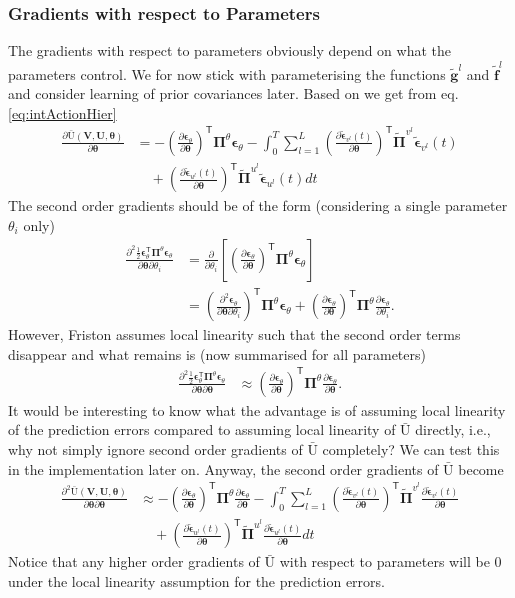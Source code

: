 \documentclass[a4paper,10pt]{article}
\newcommand{\bs}[1]{\mathbf{#1}}					%
\newcommand{\bgs}[1]{\boldsymbol{#1}}				%
\newcommand{\pd}[2]{\frac{\partial #1}{\partial #2}} 	%
\newcommand{\ppd}[3]{\frac{\partial^2 #1}{\partial #2 \partial #3}} %
\newcommand{\tr}{\mathsf{T}}				%
\newcommand{\gc}[1]{\tilde{#1}} %
\renewcommand{\ss}{u}         %
\newcommand{\sv}{v}         %
\newcommand{\spe}{\epsilon} %
\renewcommand{\sp}{\theta}    %
\newcommand{\ppe}{\bgs{\spe}} %
\newcommand{\ppeg}{\gc{\ppe}} %
\newcommand{\pp}{\bgs{\sp}} %
\newcommand{\Ps}{\bs{U}}    %
\newcommand{\Pv}{\bs{V}}    %
\newcommand{\Ua}{\bar{\mathrm{U}}}		%
\begin{document}
\subsubsection{Gradients with respect to Parameters}
The gradients with respect to parameters obviously depend on what the parameters control. We for now stick with parameterising the functions $\gc{\bs{g}}^l$ and $\gc{\bs{f}}^l$ and consider learning of prior covariances later. Based on \citep[][eq. (85)]{Petersen2008} we get from eq. \eqref{eq:intActionHier}
\begin{align}
    \pd{\Ua(\Pv,\Ps,\pp)}{\pp} &= -\left(\pd{\ppe_\sp}{\pp}\right)^\tr\bgs{\Pi}^{\sp}\ppe_\sp - \int_0^T \sum_{l=1}^L \left(\pd{\ppeg_{\sv^l}(t)}{\pp}\right)^\tr\gc{\bgs{\Pi}}^{\sv^l}\ppeg_{\sv^l}(t)\nonumber\\
    &\quad + \left(\pd{\ppeg_{\ss^l}(t)}{\pp}\right)^\tr\gc{\bgs{\Pi}}^{\ss^l}\ppeg_{\ss^l}(t)  dt
\end{align}
The second order gradients should be of the form (considering a single parameter $\sp_i$ only)
\begin{align}
    \ppd{\frac{1}{2}\ppe_\sp^\tr\bgs{\Pi}^{\sp}\ppe_\sp}{\pp}{\sp_i} &= \pd{}{\sp_i}\left[\left(\pd{\ppe_\sp}{\pp}\right)^\tr\bgs{\Pi}^{\sp}\ppe_\sp\right]\nonumber\\
    &= \left(\ppd{\ppe_\sp}{\pp}{\sp_i}\right)^\tr\bgs{\Pi}^{\sp}\ppe_\sp + \left(\pd{\ppe_\sp}{\pp}\right)^\tr\bgs{\Pi}^{\sp}\pd{\ppe_\sp}{\sp_i}.
\end{align}
However, Friston assumes local linearity such that the second order terms disappear and what remains is (now summarised for all parameters)
\begin{align}
    \ppd{\frac{1}{2}\ppe_\sp^\tr\bgs{\Pi}^{\sp}\ppe_\sp}{\pp}{\pp} &\approx \left(\pd{\ppe_\sp}{\pp}\right)^\tr\bgs{\Pi}^{\sp}\pd{\ppe_\sp}{\pp}.
\end{align}
It would be interesting to know what the advantage is of assuming local linearity of the prediction errors compared to assuming local linearity of $\Ua$ directly, i.e., why not simply ignore second order gradients of $\Ua$ completely? We can test this in the implementation later on. Anyway, the second order gradients of $\Ua$ become
\begin{align}
    \ppd{\Ua(\Pv,\Ps,\pp)}{\pp}{\pp} &\approx -\left(\pd{\ppe_\sp}{\pp}\right)^\tr\bgs{\Pi}^{\sp}\pd{\ppe_\sp}{\pp} - \int_0^T \sum_{l=1}^L \left(\pd{\ppeg_{\sv^l}(t)}{\pp}\right)^\tr\gc{\bgs{\Pi}}^{\sv^l}\pd{\ppeg_{\sv^l}(t)}{\pp}\nonumber\\
    &\quad + \left(\pd{\ppeg_{\ss^l}(t)}{\pp}\right)^\tr\gc{\bgs{\Pi}}^{\ss^l}\pd{\ppeg_{\ss^l}(t)}{\pp}  dt
\end{align}
Notice that any higher order gradients of $\Ua$ with respect to parameters will be 0 under the local linearity assumption for the prediction errors. 
\end{document}
